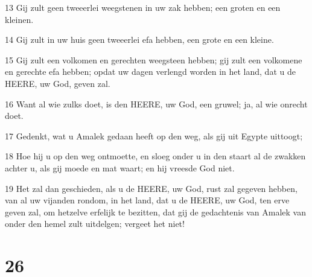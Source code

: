 \par 13 Gij zult geen tweeerlei weegstenen in uw zak hebben; een groten en een kleinen.
\par 14 Gij zult in uw huis geen tweeerlei efa hebben, een grote en een kleine.
\par 15 Gij zult een volkomen en gerechten weegsteen hebben; gij zult een volkomene en gerechte efa hebben; opdat uw dagen verlengd worden in het land, dat u de HEERE, uw God, geven zal.
\par 16 Want al wie zulks doet, is den HEERE, uw God, een gruwel; ja, al wie onrecht doet.
\par 17 Gedenkt, wat u Amalek gedaan heeft op den weg, als gij uit Egypte uittoogt;
\par 18 Hoe hij u op den weg ontmoette, en sloeg onder u in den staart al de zwakken achter u, als gij moede en mat waart; en hij vreesde God niet.
\par 19 Het zal dan geschieden, als u de HEERE, uw God, rust zal gegeven hebben, van al uw vijanden rondom, in het land, dat u de HEERE, uw God, ten erve geven zal, om hetzelve erfelijk te bezitten, dat gij de gedachtenis van Amalek van onder den hemel zult uitdelgen; vergeet het niet!

\chapter{26}

